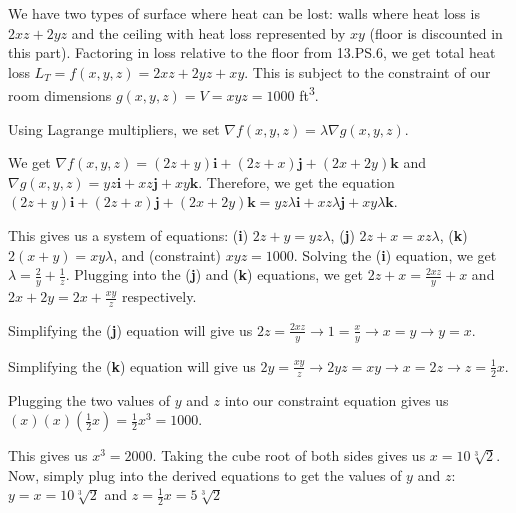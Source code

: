 \documentclass{article}
\begin{document}
\par\noindent\large We have two types of surface where heat can be lost: walls where heat loss is $2xz + 2yz$ and the ceiling with heat loss represented by $xy$ (floor is discounted in this part).  Factoring in loss relative to the floor from 13.PS.6, we get total heat loss $L_{T} = f(x, y, z) = 2xz + 2yz + xy$.  This is subject to the constraint of our room dimensions $g(x, y, z) = V = xyz = 1000$ ft\textsuperscript{3}.\vspace{0.25cm}

\par\noindent\large Using Lagrange multipliers, we set $\nabla f(x, y, z) = \lambda\nabla g(x, y, z)$.
\par\noindent\large We get $\nabla f(x, y, z) = (2z + y)\textbf{i} + (2z + x)\textbf{j} + (2x + 2y)\textbf{k}$ and $\nabla g(x, y, z) = yz\textbf{i} + xz\textbf{j} + xy\textbf{k}$.  Therefore, we get the equation $(2z + y)\textbf{i} + (2z + x)\textbf{j} + (2x + 2y)\textbf{k} = yz\lambda\textbf{i} + xz\lambda\textbf{j} + xy\lambda\textbf{k}$.\vspace{0.25cm}

\par\noindent\large This gives us a system of equations: (\textbf{i}) $2z + y = yz\lambda$, (\textbf{j}) $2z + x = xz\lambda$, (\textbf{k}) $2(x + y) = xy\lambda$, and (constraint) $xyz = 1000$. Solving the (\textbf{i}) equation, we get $\lambda = \frac{2}{y} + \frac{1}{z}$.  Plugging into the (\textbf{j}) and (\textbf{k}) equations, we get $2z + x = \frac{2xz}{y} + x$ and $2x + 2y = 2x + \frac{xy}{z}$ respectively.\vspace{0.25cm}

\par\noindent\large Simplifying the (\textbf{j}) equation will give us $2z = \frac{2xz}{y} \rightarrow 1 = \frac{x}{y} \rightarrow x = y \rightarrow y = x$.
\par\noindent\large Simplifying the (\textbf{k}) equation will give us $2y = \frac{xy}{z} \rightarrow 2yz = xy \rightarrow x = 2z \rightarrow z = \frac{1}{2}x$.
\par\noindent\large Plugging the two values of $y$ and $z$ into our constraint equation gives us $(x)(x)(\frac{1}{2}x) = \frac{1}{2}x^{3} = 1000$.
\par\noindent\large This gives us $x^{3} = 2000$.  Taking the cube root of both sides gives us $x = 10\sqrt[3]{2}$.  Now, simply plug into the derived equations to get the values of $y$ and $z$: $y = x = 10\sqrt[3]{2}$ and $z = \frac{1}{2}x = 5\sqrt[3]{2}$
\end{document}
